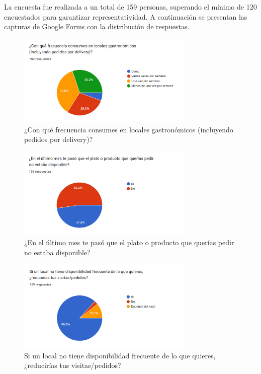 
La encuesta fue realizada a un total de 159 personas, superando el mínimo de 120 encuestados para garantizar representatividad. A continuación se presentan las capturas de Google Forms con la distribución de respuestas.

\begin{figure}[!htbp]
  \centering
  \includegraphics[width=0.75\textwidth]{images/pregunta1.png}
  \caption{¿Con qué frecuencia consumes en locales gastronómicos (incluyendo pedidos por delivery)?}
  \label{fig:anexo-p1}
\end{figure}

\begin{figure}[!htbp]
  \centering
  \includegraphics[width=0.75\textwidth]{images/pregunta2.png}
  \caption{¿En el último mes te pasó que el plato o producto que querías pedir no estaba disponible?}
  \label{fig:anexo-p2}
\end{figure}

\begin{figure}[!htbp]
  \centering
  \includegraphics[width=0.75\textwidth]{images/pregunta3.png}
  \caption{Si un local no tiene disponibilidad frecuente de lo que quieres, ¿reducirías tus visitas/pedidos?}
  \label{fig:anexo-p3}
\end{figure}

